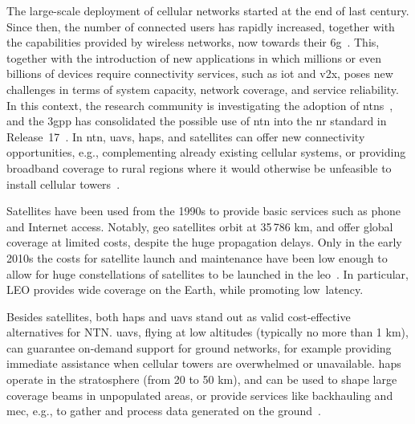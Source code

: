 
The large-scale deployment of cellular networks started at the end of last century.
Since then, the number of connected users has rapidly increased, together with the capabilities provided by wireless networks, now towards their \gls{6g}~\cite{giordani2020toward}.
This, together with the introduction of new applications in which millions or even billions of devices require connectivity services, such as \gls{iot} and \gls{v2x}, poses new challenges in terms of system capacity, network coverage, and service reliability. 
In this context, the research community is investigating the adoption of \glspl{ntn}~\cite{giordani2021non}, and the \gls{3gpp} has consolidated the possible use of \gls{ntn} into the \gls{nr} standard in Release~17~\cite{21917}.
In \gls{ntn}, \glspl{uav}, \glspl{hap}, and satellites can offer new connectivity opportunities, e.g., complementing already existing cellular systems, or providing broadband coverage to rural regions where it would otherwise be unfeasible to install cellular towers~\cite{Chaoub20216g}.

Satellites have been used from the 1990s to provide basic services such as phone and Internet access. Notably,  \gls{geo} satellites orbit at 35\,786 km, and offer global coverage at limited costs, despite the huge propagation delays. 
Only in the early 2010s the costs for satellite launch and maintenance have been low enough to allow for huge constellations of satellites to be launched in the \gls{leo}~\cite{satcost}. In particular, LEO provides wide coverage on the Earth, while promoting low~latency. 

Besides satellites, both \glspl{hap} and \glspl{uav} stand out as valid cost-effective alternatives for NTN. 
\glspl{uav}, flying at low altitudes (typically no more than 1 km), can guarantee on-demand support for ground networks, for example providing immediate assistance when cellular towers are overwhelmed or unavailable. \glspl{hap} operate in the stratosphere (from 20 to 50 km), and can be used to shape large coverage beams in  unpopulated areas, or provide services like backhauling and \gls{mec}, e.g., to gather and process data generated on the ground~\cite{traspadini2023real,wang2020potential}. %

